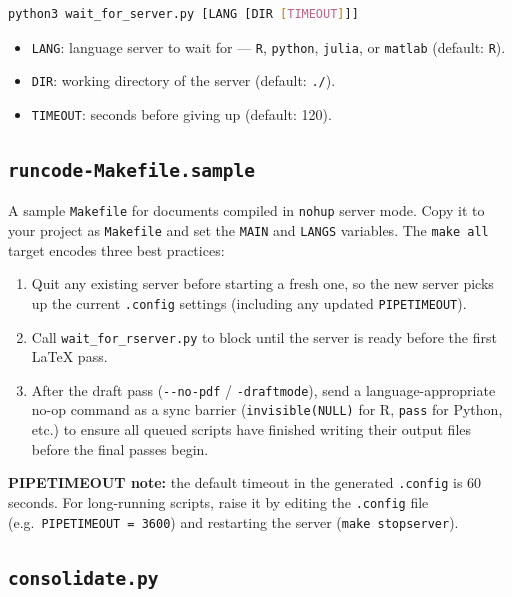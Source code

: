 \documentclass{ltxdoc}
\newcommand{\opt}[1]{\texttt{#1}}
\newcommand{\file}[1]{\texttt{#1}}
\begin{document}
\begin{lstlisting}[language=bash]
python3 wait_for_server.py [LANG [DIR [TIMEOUT]]]
\end{lstlisting}

\begin{itemize}
  \item \texttt{LANG}: language server to wait for --- \texttt{R},
    \texttt{python}, \texttt{julia}, or \texttt{matlab} (default: \texttt{R}).
  \item \texttt{DIR}: working directory of the server (default: \texttt{./}).
  \item \texttt{TIMEOUT}: seconds before giving up (default: 120).
\end{itemize}

\subsection{\file{runcode-Makefile.sample}}

A sample \file{Makefile} for documents compiled in \opt{nohup} server
mode.  Copy it to your project as \file{Makefile} and set the
\texttt{MAIN} and \texttt{LANGS} variables.  The \texttt{make all}
target encodes three best practices:

\begin{enumerate}
  \item Quit any existing server before starting a fresh one, so the
    new server picks up the current \file{.config} settings
    (including any updated \texttt{PIPETIMEOUT}).
  \item Call \file{wait\_for\_rserver.py} to block until the server is
    ready before the first \LaTeX{} pass.
  \item After the draft pass (\texttt{-{}-no-pdf} / \texttt{-draftmode}),
    send a language-appropriate no-op command as a sync barrier
    (\texttt{invisible(NULL)} for R, \texttt{pass} for Python, etc.)
    to ensure all queued scripts have finished writing their output
    files before the final passes begin.
\end{enumerate}

\textbf{PIPETIMEOUT note:} the default timeout in the generated
\file{.config} is 60 seconds.  For long-running scripts, raise it by
editing the \file{.config} file (e.g.\ \texttt{PIPETIMEOUT = 3600})
and restarting the server (\texttt{make stopserver}).

\subsection{\file{consolidate.py}}
\end{document}

